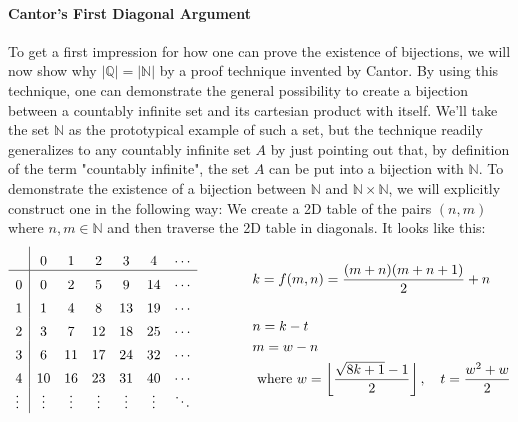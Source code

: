 \paragraph{Cantor's First Diagonal Argument} 
To get a first impression for how one can prove the existence of bijections, we will now show why $|\mathbb{Q}| = |\mathbb{N}|$ by a proof technique invented by Cantor. By using this technique, one can demonstrate the general possibility to create a bijection between a countably infinite set and its cartesian product with itself. We'll take the set $\mathbb{N}$ as the prototypical example of such a set, but the technique readily generalizes to any countably infinite set $A$ by just pointing out that, by definition of the term "countably infinite", the set $A$ can be put into a bijection with $\mathbb{N}$. To demonstrate the existence of a bijection between $\mathbb{N}$ and $\mathbb{N} \times \mathbb{N}$, we will explicitly construct one in the following way: We create a 2D table of the pairs $(n, m)$ where $n,m \in \mathbb{N}$ and then traverse the 2D table in diagonals. It looks like this:
\[
\setlength{\extrarowheight}{5pt}%
\begin{array}{l|*{6}{c}}
	       &  0     &  1     &  2     &  3      &  4     & \cdots \\
	\hline
	0      &  0     &  2     &  5     &  9      & 14     & \cdots \\
	1      &  1     &  4     &  8     & 13      & 19     & \cdots \\
	2      &  3     &  7     & 12     & 18      & 25     & \cdots \\
	3      &  6     & 11     & 17     & 24      & 32     & \cdots \\
	4      & 10     & 16     & 23     & 31      & 40     & \cdots \\
	\vdots & \vdots & \vdots & \vdots & \vdots  & \vdots & \ddots \\
\end{array} 
\qquad \qquad
\begin{aligned}
&k = f(m,n) = \frac{(m+n)(m+n+1)}{2} + n \\
\\
&n = k-t\\ 
&m = w-n\\
& \text{ where } w = \left\lfloor \frac{\sqrt{8k+1}-1}{2} \right\rfloor, 
  \quad          t = \frac{w^2+w}{2} 
\end{aligned}
\]
